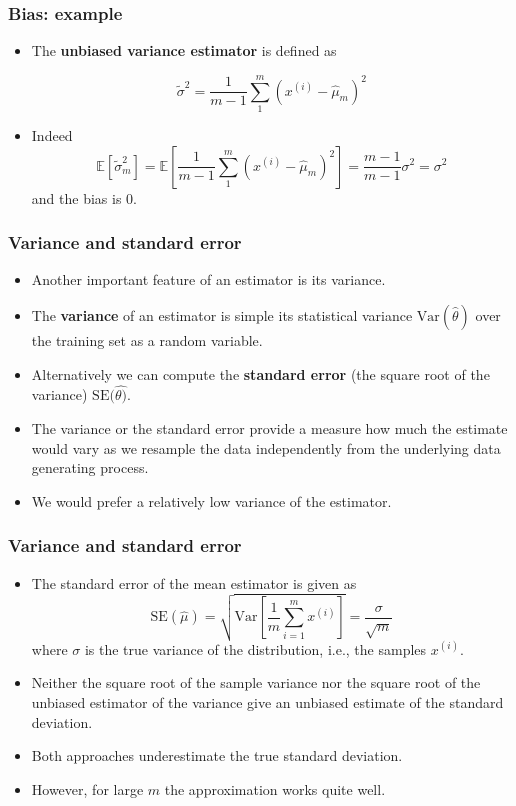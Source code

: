 \documentclass[notes]{beamer}          %
\newcommand{\field}[1]{\mathbb{#1}}
\begin{document}
\begin{frame}
\frametitle{Bias: example}
\begin{itemize}
    \item The {\bf unbiased variance estimator} is defined as


    $$
        \tilde{\sigma}^2 = \frac{1}{m - 1}\sum_{1}^{m} \left (  x^{(i)} - \hat{\mu}_m \right )^2
    $$
    \item Indeed
    $$
    \field E [\tilde{\sigma}^2_m] = \field{E} \left [ \frac{1}{m-1}\sum_{1}^{m} \left (  x^{(i)} - \hat{\mu}_m \right )^2 \right ] = \frac{m-1}{m-1} \sigma^2 = \sigma^2
    $$
    and the bias is $0$. \\
\end{itemize}
\end{frame}


\begin{frame}
\frametitle{Variance and standard error}
    \begin{itemize}
        \item Another important feature of an estimator is its variance.
        \item The {\bf variance} of an estimator is simple its statistical variance $\mbox{Var}(\hat{\theta})$ over the training set as a random variable.
        \item Alternatively we can compute the {\bf standard error} (the square root of the variance) $\mbox{SE}(\hat{\theta)}$.
        \item The variance or the standard error provide a measure how much the estimate would vary as we resample the data independently from the underlying data generating process.
        \item We would prefer a relatively low variance of the estimator.
    \end{itemize}
\end{frame}


\begin{frame}
\frametitle{Variance and standard error}
    \begin{itemize}
        \item The standard error of the mean estimator is given as
        $$
        \mbox{SE}(\hat{\mu}) = \sqrt{\mbox{Var}\left[\frac{1}{m}\sum_{i=1}^m x^{(i)}\right]} = \frac{\sigma}{\sqrt{m}}
        $$
        where $\sigma$ is the true variance of the distribution, i.e., the samples $x^{(i)}$.
        \item Neither the square root of the sample variance nor the square root of the unbiased estimator of the variance give an unbiased estimate of the standard deviation.
        \item Both approaches underestimate the true standard deviation.
        \item However, for large $m$ the approximation works quite well.
    \end{itemize}
\end{frame}
\end{document}
